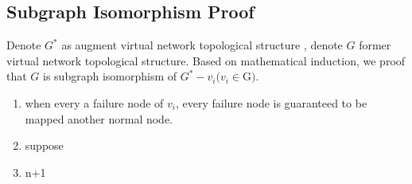 \subsection{Subgraph Isomorphism Proof}
Denote $G^*$ as augment virtual network topological structure , denote $G$ former virtual network topological structure. Based on mathematical induction, we proof that $G$ is subgraph isomorphism of $G^*-v_i (v_i\in $G$)$.
\begin{enumerate}
  \item when every a failure node of $v_i$, every failure node is guaranteed to be mapped another normal node.
  \item suppose
  \item n+1
\end{enumerate}
